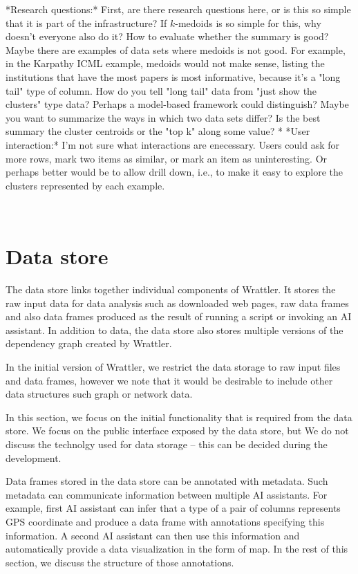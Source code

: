 \documentclass[sigplan,preprint,10pt]{acmart}\settopmatter{printfolios=true,printccs=false,printacmref=false}
\theoremstyle{plain}
\theoremstyle{definition}
\begin{document}
{*Research questions:* First, are there research questions here, or is this so simple
that it  is part of the infrastructure?  If $k$-medoids is so simple for this,
why doesn't everyone also do it? How to evaluate whether the summary is good?
Maybe there are examples of data sets where medoids is not good.
For example, in the Karpathy ICML example, medoids would not make sense,
listing the institutions that have the most papers is most informative, because
it's a "long tail" type of column. How do you tell "long tail" data from "just show
the clusters" type data? Perhaps a model-based framework could distinguish?
Maybe you want to summarize the ways in which two data sets differ?
Is the best summary the cluster centroids or the "top k" along some value? 
* *User interaction:* I'm not sure what interactions are enecessary.
Users could ask for more rows, mark two items as similar, or mark an item as uninteresting.
Or perhaps better would be to allow drill down, i.e., to make it easy to explore
the clusters represented by each example.
}

\newpage
~
\newpage

\section{Data store}
\label{sec:datastore}

The data store links together individual components of Wrattler. It stores the raw input 
data for data analysis such as downloaded web pages, raw data frames and also data frames
produced as the result of running a script or invoking an AI assistant. In addition to data,
the data store also stores multiple versions of the dependency graph created by Wrattler.

In the initial version of Wrattler, we restrict the data storage to raw input files and
data frames, however we note that it would be desirable to include other data structures
such graph or network data. 

In this section, we focus on the initial functionality that is required from the data store.
We focus on the public interface exposed by the data store, but We do not discuss the technolgy 
used for data storage -- this can be decided during the development.

Data frames stored in the data store can be annotated with metadata. Such metadata can 
communicate information between multiple AI assistants. For example, first AI assistant can
infer that a type of a pair of columns represents GPS coordinate and produce a data frame
with annotations specifying this information. A second AI assistant can then use this information
and automatically provide a data visualization in the form of map. In the rest of this section,
we discuss the structure of those annotations.
\end{document}
